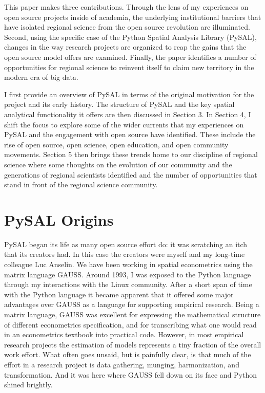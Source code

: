 \documentclass[11pt]{article}
\begin{document}
This paper makes three contributions. Through the lens of my
experiences on open source projects inside of academia, the underlying
institutional barriers that have isolated regional science from the open source
revolution are illuminated. Second, using the specific case of the Python
Spatial Analysis Library (PySAL), changes in the way research projects are
organized to reap the gains that the open source model offers are examined.
Finally, the paper identifies a number of opportunities for regional science to
reinvent itself to claim new territory in the modern era of big data.

I first provide an overview of PySAL in terms of the original motivation for
the project and its early history. The structure of PySAL and the key spatial
analytical functionality it offers are then discussed in Section 3. In Section
4, I shift the focus to explore some of the wider currents that my experiences
on PySAL and the engagement with open source have identified. These include the
rise of open source, open science, open education, and open community
movements. Section 5 then brings these trends home to our discipline of
regional science where some thoughts on the evolution of our community and the
generations of regional scientists identified and the number of opportunities
that stand in front of the regional science community.

\section*{PySAL Origins}
\label{sec:orgb135799}
PySAL began its life as many open source effort do: it was scratching
an itch that its creators had. In this case the creators were myself and my
long-time colleague Luc Anselin. We have been working in spatial econometrics
using the matrix language GAUSS. Around 1993, I was exposed to the Python
language through my interactions with the Linux community. After a short span of
time with the Python language it became apparent that it offered some major
advantages over GAUSS as a language for supporting empirical research. Being a
matrix language, GAUSS was excellent for expressing the mathematical structure
of different econometrics specification, and for transcribing what one would
read in an econometrics textbook into practical code. However, in most empirical
research projects the estimation of models represents a tiny fraction of the
overall work effort. What often goes unsaid, but is painfully clear, is that
much of the effort in a research project is data gathering, munging,
harmonization, and transformation. And it was here where GAUSS fell down on its
face and Python shined brightly.
\end{document}
